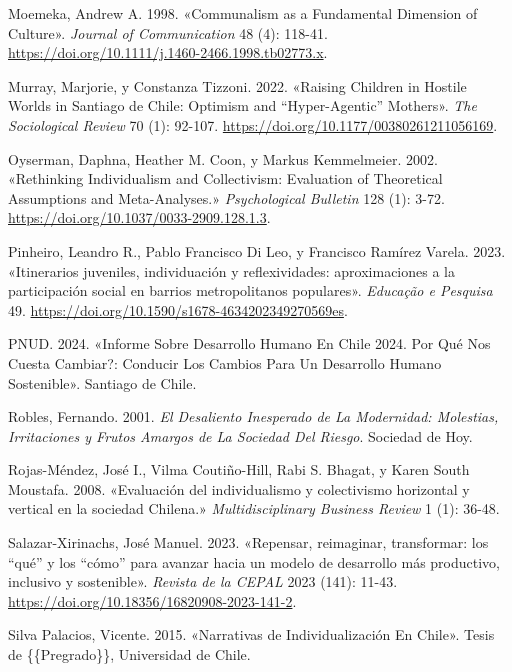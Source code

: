 \documentclass[
  letterpaper,
  DIV=11,
  numbers=noendperiod]{scrartcl}
\newlength{\cslhangindent}
\newenvironment{CSLReferences}[2] %
 {\begin{list}{}{%
  \setlength{\itemindent}{0pt}
  \setlength{\leftmargin}{0pt}
  \setlength{\parsep}{0pt}
  \ifodd #1
   \setlength{\leftmargin}{\cslhangindent}
   \setlength{\itemindent}{-1\cslhangindent}
  \fi
  \setlength{\itemsep}{#2\baselineskip}}}
 {\end{list}}
\begin{document}
\begin{CSLReferences}{1}{0}
Moemeka, Andrew A. 1998. {«Communalism as a {Fundamental Dimension} of
{Culture}»}. \emph{Journal of Communication} 48 (4): 118-41.
\url{https://doi.org/10.1111/j.1460-2466.1998.tb02773.x}.

Murray, Marjorie, y Constanza Tizzoni. 2022. {«Raising Children in
Hostile Worlds in {Santiago} de {Chile}: {Optimism} and
{``Hyper-Agentic''} Mothers»}. \emph{The Sociological Review} 70 (1):
92-107. \url{https://doi.org/10.1177/00380261211056169}.

Oyserman, Daphna, Heather M. Coon, y Markus Kemmelmeier. 2002.
{«Rethinking Individualism and Collectivism: {Evaluation} of Theoretical
Assumptions and Meta-Analyses.»} \emph{Psychological Bulletin} 128 (1):
3-72. \url{https://doi.org/10.1037/0033-2909.128.1.3}.

Pinheiro, Leandro R., Pablo Francisco Di Leo, y Francisco Ramírez
Varela. 2023. {«{Itinerarios juveniles, individuaci{ó}n y
reflexividades: aproximaciones a la participaci{ó}n social en barrios
metropolitanos populares}»}. \emph{Educa{ç}{ã}o e Pesquisa} 49.
\url{https://doi.org/10.1590/s1678-4634202349270569es}.

PNUD. 2024. {«Informe Sobre {Desarrollo Humano} En {Chile} 2024.
{\textquestiondown}{Por} Qu{é} Nos Cuesta Cambiar?: Conducir Los Cambios
Para Un {Desarrollo Humano Sostenible}»}. Santiago de Chile.

Robles, Fernando. 2001. \emph{El Desaliento Inesperado de La Modernidad:
{Molestias}, Irritaciones y Frutos Amargos de La Sociedad Del Riesgo}.
Sociedad de Hoy.

Rojas-Méndez, José I., Vilma Coutiño-Hill, Rabi S. Bhagat, y Karen South
Moustafa. 2008. {«{Evaluaci{ó}n del individualismo y colectivismo
horizontal y vertical en la sociedad Chilena.}»} \emph{Multidisciplinary
Business Review} 1 (1): 36-48.

Salazar-Xirinachs, José Manuel. 2023. {«{Repensar, reimaginar,
transformar: los {``qu{é}''} y los {``c{ó}mo''} para avanzar hacia un
modelo de desarrollo m{á}s productivo, inclusivo y sostenible}»}.
\emph{Revista de la CEPAL} 2023 (141): 11-43.
\url{https://doi.org/10.18356/16820908-2023-141-2}.

Silva Palacios, Vicente. 2015. {«Narrativas de {Individualizaci{ó}n} En
{Chile}»}. Tesis de \{\{Pregrado\}\}, Universidad de Chile.


\end{CSLReferences}
\end{document}
